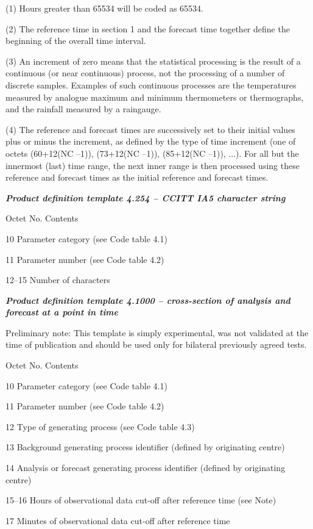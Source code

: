 (1) Hours greater than 65534 will be coded as 65534.

(2) The reference time in section 1 and the forecast time together define the beginning of the overall time interval.

(3) An increment of zero means that the statistical processing is the result of a continuous (or near continuous) process, not the processing of a number of discrete samples. Examples of such continuous processes are the temperatures measured by analogue maximum and minimum thermometers or thermographs, and the rainfall measured by a raingauge.

(4) The reference and forecast times are successively set to their initial values plus or minus the increment, as defined by the type of time increment (one of octets (60+12(NC --1)), (73+12(NC --1)), (85+12(NC --1)), ...). For all but the innermost (last) time range, the next inner range is then processed using these reference and forecast times as the initial reference and forecast times.

\emph{\textbf{Product definition template 4.254 -- CCITT IA5 character string}}

Octet No. Contents

10 Parameter category (see Code table 4.1)

11 Parameter number (see Code table 4.2)

12--15 Number of characters

\emph{\textbf{Product definition template 4.1000 -- cross-section of analysis and forecast at a point in time}}

Preliminary note: This template is simply experimental, was not validated at the time of publication and should be used only for bilateral previously agreed tests.

Octet No. Contents

10 Parameter category (see Code table 4.1)

11 Parameter number (see Code table 4.2)

12 Type of generating process (see Code table 4.3)

13 Background generating process identifier (defined by originating centre)

14 Analysis or forecast generating process identifier (defined by originating centre)

15--16 Hours of observational data cut-off after reference time (see Note)

17 Minutes of observational data cut-off after reference time

